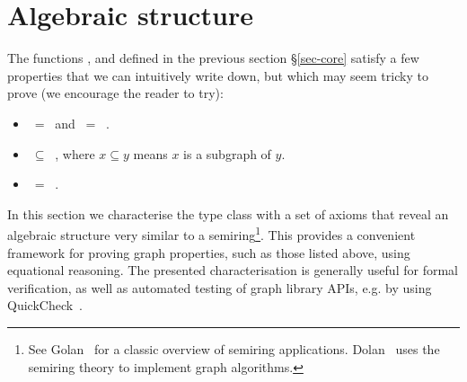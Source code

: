 \section{Algebraic structure}\label{sec-algebra}

The functions ,  and  defined in the previous
section \S\ref{sec-core} satisfy a few properties that we can intuitively write down,
but which may seem tricky to prove (we encourage the reader to try):
\begin{itemize}
    \item {} $\ =\ $  and  $\ =\ $ .
    \item {} $\ \subseteq\ $ , where $x \subseteq y$ means
    $x$ is a subgraph of $y$.
    \item {} $\ =\ $ .
\end{itemize}

In this section we characterise the  type class with a set of
axioms that reveal an algebraic structure very similar to a semiring\footnote{
See Golan~\citeyear{1999_semirings_golan} for a classic overview of semiring
applications. Dolan~\citeyear{2013_semirings_dolan} uses the semiring theory
to implement graph algorithms.}.
This provides a convenient framework for proving graph properties, such as
those listed above, using equational
reasoning. The presented characterisation is generally useful for formal
verification, as well as automated testing
of graph library APIs, e.g. by using QuickCheck~\cite{2011_quickcheck_claessen}.

